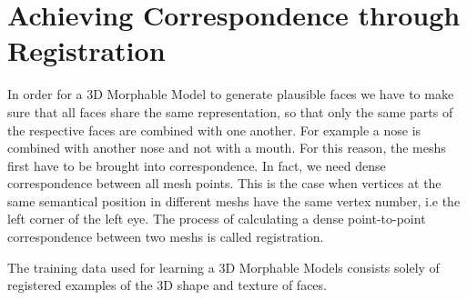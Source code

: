 \section{Achieving Correspondence through Registration}
In order for a 3D Morphable Model to generate plausible faces we have to make sure that all faces share the same representation, so that only the same parts of the respective faces are combined with one another. For example a nose is combined with another nose and not with a mouth. For this reason, the meshs first have to be brought into correspondence. In fact, we need dense correspondence between all mesh points. This is the case when vertices at the same semantical position in
different meshs have the same vertex number, i.e the left corner of the left eye. The process of calculating a dense point-to-point correspondence between two meshs is called registration.  

The training data used for learning a 3D Morphable Models consists solely of registered examples of the 3D shape and texture of faces.


